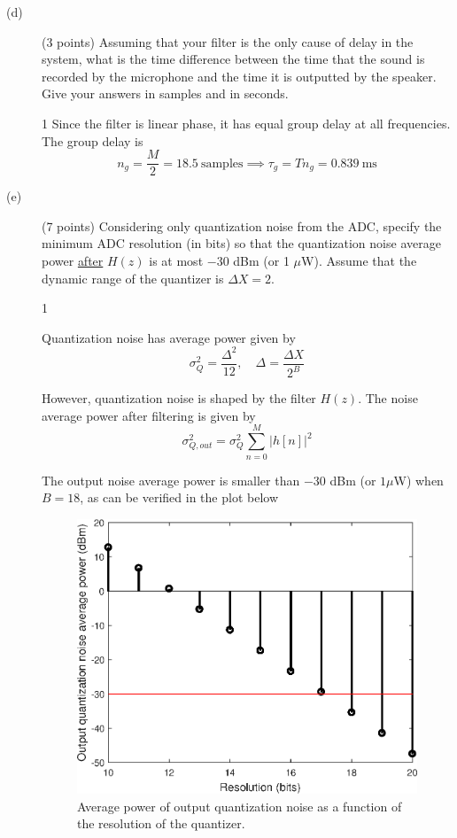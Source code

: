 \documentclass[10pt]{article}
\def\SOLUTIONS{1} %
\def\SolutionsColor{red2}
\begin{document}
\begin{description}
	\item[(d)] (3 points) Assuming that your filter is the only cause of delay in the system, what is the time difference between the time that the sound is recorded by the microphone and the time it is outputted by the speaker. Give your answers in samples and in seconds. 
	
	\if\SOLUTIONS1 {\color{\SolutionsColor} Since the filter is linear phase, it has equal group delay at all frequencies. The group delay is
		\begin{equation*}
			n_g = \frac{M}{2} = 18.5~\text{samples} \implies \tau_g = Tn_g = 0.839~\text{ms}
		\end{equation*}	
	}\fi

	\item[(e)] (7 points) Considering only quantization noise from the ADC, specify the minimum ADC resolution (in bits) so that the quantization noise average power \underline{after} $H(z)$ is at most $-30$ dBm (or 1 $\mu$W). Assume that the dynamic range of the quantizer is $\Delta X = 2$.
	
	\if\SOLUTIONS1 {\color{\SolutionsColor} Quantization noise has average power given by
		\begin{equation*}
			\sigma_Q^2 = \frac{\Delta^2}{12}, \quad \Delta = \frac{\Delta X}{2^B}
		\end{equation*}
		
		However, quantization noise is shaped by the filter $H(z)$. The noise average power after filtering is given by
		\begin{equation*}
			\sigma^2_{Q, out} = \sigma_Q^2\sum_{n = 0}^{M}|h[n]|^2 \tag{quantization noise shaping}
		\end{equation*}
		
		The output noise average power is smaller than $-30$ dBm (or $1 \mu$W) when $B = 18$, as can be verified in the plot below
		
		\FloatBarrier
		\begin{figure}[h!]
			\centering
			\includegraphics[scale=0.6]{figs/hearing_aid_quant_noise_var.eps}
			\caption{Average power of output quantization noise as a function of the resolution of the quantizer.}
		\end{figure}
		\FloatBarrier	
		
}
\end{description}
\end{document}

